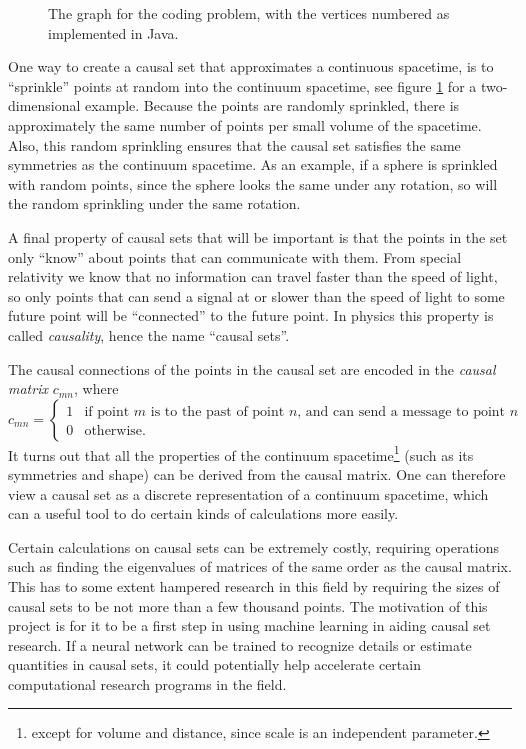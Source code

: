 \documentclass[letterpaper,10pt]{article}
\begin{document}
\begin{figure}
\begin{center}
\end{center}
  \caption{
The graph for the coding problem, with the vertices numbered as implemented in Java.} \label{causet2d}
\end{figure}

One way to create a causal set that approximates a continuous spacetime, is to ``sprinkle'' points at random into the continuum spacetime, see figure 
\ref{causet2d} for a two-dimensional example.  Because the points are randomly sprinkled, there is approximately the same number of points per small volume 
of the spacetime.  Also, this random sprinkling ensures that the causal set satisfies the same symmetries as the continuum spacetime.  As an example, if a 
sphere is sprinkled with random points, since the sphere looks the same under any rotation, so will the random sprinkling under the same rotation.

A final property of causal sets that will be important is that the points in the set only ``know'' about points that can communicate with them.  From 
special relativity we know that no information can travel faster than the speed of light, so only points that can send a signal at or slower than the 
speed of light to some future point will be ``connected'' to the future point.  In physics this property is called {\it causality}, hence the name 
``causal sets''.

The causal connections of the points in the causal set are encoded in the {\it causal matrix} $c_{mn}$, where
\begin{equation}
 c_{mn} = \begin{cases}
      1 & \text{if point $m$ is to the past of point $n$, and can send a message to point $n$}\\
      0 & \text{otherwise.}
    \end{cases} 
\end{equation}
It turns out that all the properties of the continuum spacetime\footnote{except for volume and distance, since scale is an independent 
parameter.} (such as its symmetries and shape) can be derived from the causal matrix.  One can therefore view a causal set as a discrete representation 
of a continuum spacetime, which can a useful tool to do certain kinds of calculations more easily.

Certain calculations on causal sets can be extremely costly, requiring operations such as finding the eigenvalues of matrices of the same order as the 
causal matrix.  This has to some extent hampered research in this field by requiring the sizes of causal sets to be not more than a few thousand points.  
The motivation of this project is for it to be a first step in using machine learning in aiding causal set research.  If a neural network can be trained
to recognize details or estimate quantities in causal sets, it could potentially help accelerate certain computational research programs in the field.
\end{document}
